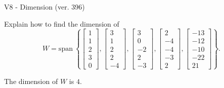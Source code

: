 \begin{exercise}
  \begin{exerciseTitle}V8 - Dimension (ver. 396)\end{exerciseTitle}
  \begin{exerciseStatement}
    Explain how to find the dimension of 
\[W=\mathrm{span}\ \left\{\left[\begin{array}{r}
1 \\
1 \\
2 \\
3 \\
0
\end{array}\right] , \left[\begin{array}{r}
3 \\
1 \\
2 \\
2 \\
-4
\end{array}\right] , \left[\begin{array}{r}
3 \\
0 \\
-2 \\
2 \\
-3
\end{array}\right] , \left[\begin{array}{r}
2 \\
-4 \\
-4 \\
-3 \\
2
\end{array}\right] , \left[\begin{array}{r}
-13 \\
-12 \\
-10 \\
-22 \\
21
\end{array}\right]\right\}.\]



  \end{exerciseStatement}
  \begin{exerciseAnswer}
   The dimension of \(W\) is  \(4\).
  


  \end{exerciseAnswer}
\end{exercise}